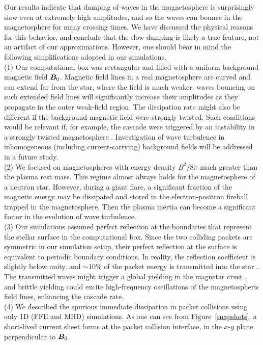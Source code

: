 Our results indicate that damping of \alfven waves in the magnetosphere is surprisingly slow even at extremely high amplitudes, and so the waves can bounce in the magnetosphere for many crossing times. We have discussed the physical reasons for this behavior, and conclude that the slow damping is likely a true feature, not an artifact of our approximations. However, one should bear in mind the following simplifications adopted in our simulations.  
\\
(1) Our computational box was rectangular and filled with a uniform background magnetic field $\boldsymbol{B}_0$. Magnetic field lines in a real magnetosphere are curved and can extend far from the star, where the field is much weaker. \alfven waves bouncing on such extended field lines will significantly increase their amplitudes as they propagate in the outer weak-field region.
The dissipation rate might also be different if the background magnetic field were strongly twisted. Such conditions would be relevant if, for example, the cascade were triggered by an instability in a strongly twisted magnetosphere \citep{2013ApJ...774...92P}. Investigation of wave turbulence in inhomogeneous (including current-carrying) background fields will be addressed in a future study.
\\
(2) We focused on magnetospheres with energy density $B^2/8\pi$ much greater than the plasma rest mass. This regime almost always holds for the magnetosphere of 
a neutron star. However, during a giant flare, a significant fraction of the magnetic energy may be dissipated and stored in the electron-positron fireball trapped in the magnetosphere. Then the plasma inertia can become a significant factor in the evolution of \alfven wave turbulence.
\\
(3) Our simulations assumed perfect reflection at the boundaries that represent the stellar surface in the computational box. Since the two colliding packets are symmetric in our simulation setup, their perfect reflection at the surface is equivalent to periodic boundary conditions. In reality, the reflection coefficient is slightly below unity, and $\sim 10$\% of the packet energy is transmitted into the star \citep{2015ApJ...815...25L}. 
The transmitted \alfven waves might trigger a global yielding in the magnetar crust \citep{2017ApJ...841...54T}, and brittle yielding could excite high-frequency oscillations of the magnetospheric field lines, enhancing the cascade rate.
\\
(4) We described the spurious immediate dissipation in packet collisions using only 1D (FFE and MHD) simulations. As one can see from Figure~\ref{snapshots}, a short-lived current sheet forms at the packet collision interface, in the $x$-$y$ plane perpendicular to $\boldsymbol{B}_0$. 
